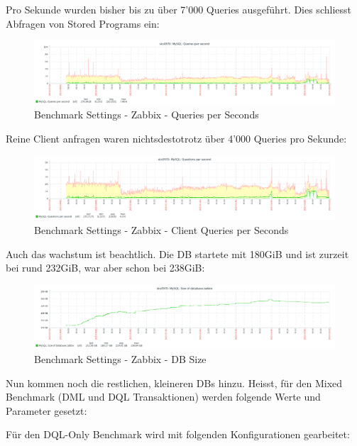 \begin{flushleft}
    Pro Sekunde wurden bisher bis zu über 7'000 Queries ausgeführt.
    Dies schliesst Abfragen von Stored Programs ein:
    \begin{figure}[H]
        \centering
        \includegraphics[width=0.8\linewidth]{source/implementation/evaluation/benchmarking/sks0970_zabbix_mariadb_queries_per_second_graph}
        \caption{Benchmark Settings - Zabbix - Queries per Seconds}
        \label{fig:sks0970_zabbix_mariadb_queries_per_second_graph}
    \end{figure}
    Reine Client anfragen waren nichtsdestotrotz über 4'000 Queries pro Sekunde:
    \begin{figure}[H]
        \centering
        \includegraphics[width=0.8\linewidth]{source/implementation/evaluation/benchmarking/sks0970_zabbix_mariadb_questions_per_second_graph}
        \caption{Benchmark Settings - Zabbix - Client Queries per Seconds}
        \label{fig:sks0970_zabbix_mariadb_questions_per_second_graph}
    \end{figure}
\end{flushleft}
\begin{flushleft}
    Auch das wachstum ist beachtlich.
    Die DB startete mit 180GiB und ist zurzeit bei rund 232GiB, war aber schon bei 238GiB:
    \begin{figure}[H]
        \centering
        \includegraphics[width=0.8\linewidth]{source/implementation/evaluation/benchmarking/sks0970_zabbix_mariadb_size_graph}
        \caption{Benchmark Settings - Zabbix - DB Size}
        \label{fig:sks0970_zabbix_mariadb_size_graph}
    \end{figure}
\end{flushleft}
\begin{flushleft}
    Nun kommen noch die restlichen, kleineren DBs hinzu.
    Heisst, für den Mixed Benchmark (DML und DQL \Gls{Transaktion}en) werden folgende Werte und Parameter gesetzt:
    
\end{flushleft}
\begin{flushleft}
    Für den DQL-Only Benchmark wird mit folgenden Konfigurationen gearbeitet:
    
\end{flushleft}